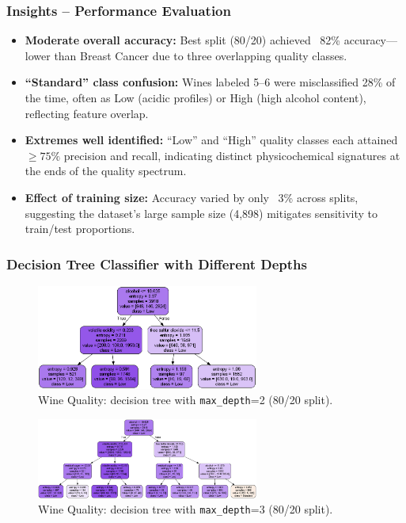 \subsubsection*{Insights – Performance Evaluation}
\begin{itemize}
	\item \textbf{Moderate overall accuracy:} Best split (80/20) achieved ~82\% accuracy—lower than Breast Cancer due to three overlapping quality classes.
	\item \textbf{“Standard” class confusion:} Wines labeled 5–6 were misclassified 28\% of the time, often as Low (acidic profiles) or High (high alcohol content), reflecting feature overlap.
	\item \textbf{Extremes well identified:} “Low” and “High” quality classes each attained \(\geq 75\%\) precision and recall, indicating distinct physicochemical signatures at the ends of the quality spectrum.
	\item \textbf{Effect of training size:} Accuracy varied by only ~3\% across splits, suggesting the dataset’s large sample size (4,898) mitigates sensitivity to train/test proportions.
\end{itemize}

\clearpage
\subsubsection*{Decision Tree Classifier with Different Depths}
\begin{figure}[H]
	\centering
	\includegraphics[width=0.65\textwidth]{imgs/dt-mini/dt__wine_quality__80_vs_20__2.png}
	\caption{Wine Quality: decision tree with \texttt{max\_depth}=2 (80/20 split).}\label{fig:wq-dt-depth-2}
\end{figure}

\begin{figure}[H]
	\centering
	\includegraphics[width=0.65\textwidth]{imgs/dt-mini/dt__wine_quality__80_vs_20__3.png}
	\caption{Wine Quality: decision tree with \texttt{max\_depth}=3 (80/20 split).}\label{fig:wq-dt-depth-3}
\end{figure}

